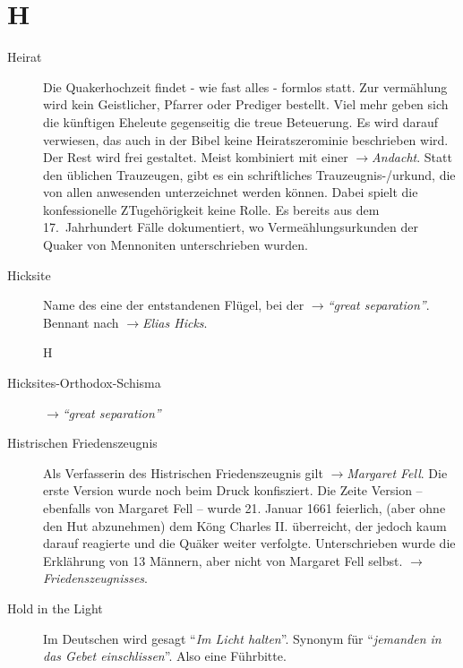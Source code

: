 \section*{H}

\articlesize

\begin{description}

 \item[Heirat] Die Quakerhochzeit findet - wie fast alles - formlos statt. Zur
 vermählung wird kein Geistlicher, Pfarrer oder Prediger bestellt. Viel mehr
 geben sich die künftigen Eheleute gegenseitig die treue Beteuerung. Es wird
 darauf verwiesen, das auch in der Bibel keine Heiratszerominie beschrieben
 wird. Der Rest wird frei gestaltet. Meist kombiniert mit einer
 $\to$\textit{Andacht}. Statt den üblichen Trauzeugen, gibt es ein schriftliches
 Trauzeugnis-/urkund, die von allen anwesenden unterzeichnet werden können.
 Dabei spielt die konfessionelle ZTugehörigkeit keine Rolle. Es bereits aus dem
 17.~Jahrhundert Fälle dokumentiert, wo Vermeählungsurkunden der Quaker von
 Mennoniten unterschrieben wurden.


 \item[Hicksite] Name des eine der entstandenen Flügel, bei der
 $\to$\textit{"`great separation"'}. Bennant nach $\to$\textit{Elias Hicks}.

 H\item[Hicksites-Orthodox-Schisma]  $\to$\textit{"`great separation"'}

 \item[Histrischen Friedenszeugnis] Als Verfasserin des Histrischen Friedenszeugnis gilt $\to$\textit{Margaret Fell}. Die erste Version wurde noch beim Druck konfisziert. Die Zeite Version -- ebenfalls von Margaret Fell -- wurde 21. Januar 1661 feierlich, (aber ohne den Hut abzunehmen) dem Köng Charles II. überreicht, der jedoch kaum darauf reagierte und die Quäker weiter verfolgte. Unterschrieben wurde die Erklährung von 13 Männern, aber nicht von Margaret Fell selbst. $\to$\textit{Friedenszeugnisses}.

\item[Hold in the Light] Im Deutschen wird gesagt "`\textit{Im Licht halten}"'.
Synonym für "`\textit{jemanden in das Gebet einschlissen}"'. Also eine Führbitte.


 \end{description}

\normalsize
